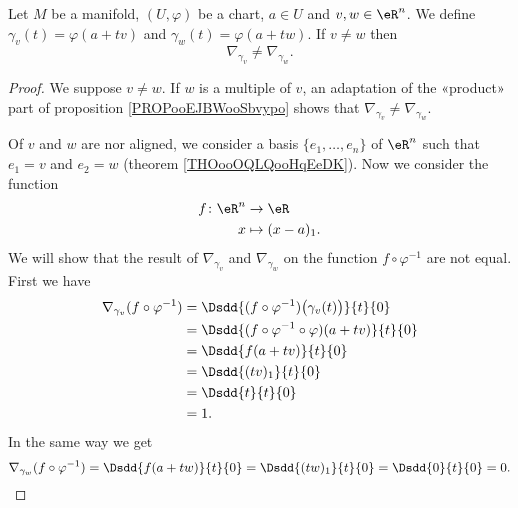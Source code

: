 \begin{lemma}       \label{LEMooGPCBooXMTddG}
	Let \( M\) be a manifold, \( (U,\varphi)\) be a chart, \( a\in U\) and \( v,w\in \eR^n\). We define \( \gamma_v(t)=\varphi(a+tv)\) and \( \gamma_w(t)=\varphi(a+tw)\). If \( v\neq w\) then
	\begin{equation}
		\nabla_{\gamma_v}\neq \nabla_{\gamma_w}.
	\end{equation}
\end{lemma}

\begin{proof}
	We suppose \( v\neq w\). If \( w\) is a multiple of \( v\), an adaptation of the «product» part of proposition \ref{PROPooEJBWooSbvypo} shows that \( \nabla_{\gamma_v}\neq \nabla_{\gamma_w}\).

	Of \( v\) and \( w\) are nor aligned, we consider a basis \( \{ e_1,\ldots, e_n \}\) of \( \eR^n\) such that \( e_1=v\) and \( e_2=w\) (theorem \ref{THOooOQLQooHqEeDK}). Now we consider the function
	\begin{equation}
		\begin{aligned}
			f\colon \eR^n & \to \eR          \\
			x             & \mapsto (x-a)_1.
		\end{aligned}
	\end{equation}
	We will show that the result of \( \nabla_{\gamma_v}\) and \( \nabla_{\gamma_w}\) on the function \( f\circ\varphi^{-1}\) are not equal. First we have
	\begin{subequations}
		\begin{align}
			\nabla_{\gamma_v}(f\circ\varphi^{-1}) & =\Dsdd{ (f\circ\varphi^{-1})\big( \gamma_v(t) \big) }{t}{0} \\
			                                      & =\Dsdd{ (f\circ\varphi^{-1}\circ\varphi)(a+tv) }{t}{0}      \\
			                                      & =\Dsdd{ f(a+tv) }{t}{0}                                     \\
			                                      & =\Dsdd{ (tv)_1 }{t}{0}                                      \\
			                                      & =\Dsdd{ t }{t}{0}                                           \\
			                                      & =1.
		\end{align}
	\end{subequations}
	In the same way we get
	\begin{equation}
		\nabla_{\gamma_w}(f\circ\varphi^{-1})=\Dsdd{ f(a+tw) }{t}{0}=\Dsdd{ (tw)_1 }{t}{0}=\Dsdd{ 0 }{t}{0}=0.
	\end{equation}
\end{proof}


